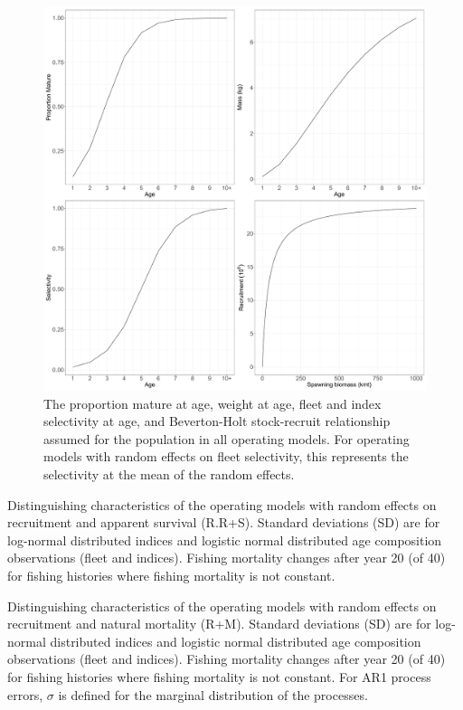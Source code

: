 \documentclass[
  12pt,
]{article}
\begin{document}
\begin{figure}[!ht]
\begin{center}
\includegraphics[width = \textwidth]{om_input_plots_figure}
\end{center}
\caption{The proportion mature at age, weight at age, fleet and index selectivity at age, and Beverton-Holt stock-recruit relationship assumed for the population in all operating models. For operating models with random effects on fleet selectivity, this represents the selectivity at the mean of the random effects.}\label{om_inputs_fig}
\end{figure}

\begin{landscape}
\begin{table}
\caption{Distinguishing characteristics of the operating models with random effects on recruitment and apparent survival (R.R+S). Standard deviations (SD) are for log-normal distributed indices and logistic normal distributed age composition observations (fleet and indices). Fishing mortality changes after year 20 (of 40) for fishing histories where fishing mortality is not constant.}\label{naa_om_table}
{\footnotesize }
\end{table}
\end{landscape}

\begin{landscape}
\begin{table}
\caption{Distinguishing characteristics of the operating models with random effects on recruitment and natural mortality (R+M). Standard deviations (SD) are for log-normal distributed indices and logistic normal distributed age composition observations (fleet and indices). Fishing mortality changes after year 20 (of 40) for fishing histories where fishing mortality is not constant. For AR1 process errors, $\sigma$ is defined for the marginal distribution of the processes.}\label{M_om_table}
{}
\end{table}
\end{landscape}
\end{document}
